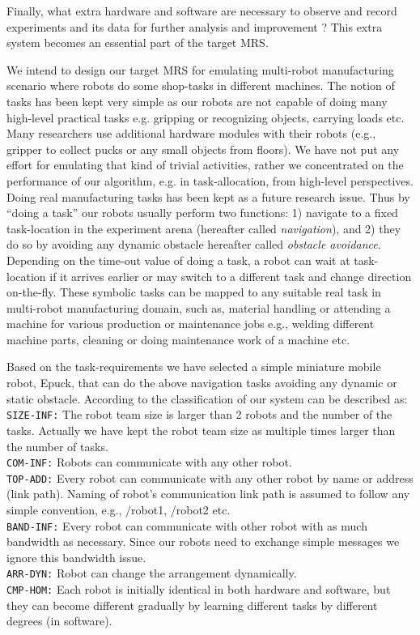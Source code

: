 Finally, what extra hardware and software are necessary to observe and record experiments  and its data for further analysis and improvement ? This extra system becomes an essential part of the target MRS. 

We intend to design our target MRS for emulating multi-robot manufacturing scenario where robots do some shop-tasks in different machines. The notion of tasks has been kept very simple as our robots are not  capable of doing many high-level practical tasks e.g. gripping or recognizing objects, carrying  loads etc. Many researchers use additional hardware modules with their robots (e.g., gripper to collect pucks or any small objects from floors). We have not put any effort for emulating that kind of trivial activities, rather we concentrated on the performance of our algorithm, e.g. in task-allocation, from high-level perspectives. Doing real manufacturing tasks has been kept as a future research issue. Thus by ``doing a task'' our robots usually perform two functions: 1) navigate to a fixed task-location in the experiment arena (hereafter called {\em navigation}), and 2) they do so by avoiding any dynamic obstacle {hereafter called {\em obstacle avoidance}}.  Depending on the time-out value of doing a task, a robot can wait at task-location if it arrives earlier or may switch to a different task and change direction on-the-fly. These symbolic tasks can be mapped to any suitable real task in multi-robot manufacturing domain, such as, material handling or attending a machine for various production or maintenance jobs e.g., welding different machine parts, cleaning or doing maintenance work of a machine etc.

Based on the task-requirements we have selected a simple miniature mobile robot, Epuck, that can do the above navigation tasks  avoiding any dynamic or static obstacle. According to the classification of \cite{Dudek+1996} our system can be described as:\\
\texttt{SIZE-INF:} The robot team size is larger than  2 robots and the number of the tasks. Actually we have kept the robot team size as multiple times larger than the number of tasks.\\
\texttt{COM-INF:} Robots can communicate with any other robot.\\
\texttt{TOP-ADD:} Every robot can communicate with any other robot by name or address (link path). Naming of robot's communication link path is assumed to follow any simple convention, e.g., /robot1, /robot2 etc.\\
\texttt{BAND-INF:} Every robot can communicate with other robot with as much bandwidth as necessary. Since our robots need to exchange simple messages we ignore this bandwidth issue.\\
\texttt{ARR-DYN:} Robot can change the arrangement dynamically.\\
\texttt{CMP-HOM:} Each robot is initially identical in both hardware and software, but they can become different gradually by learning different tasks by different degrees (in software).

